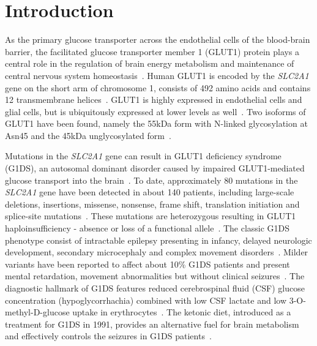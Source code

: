 
\chapter{Introduction} %
\label{Chapter1} %

As the primary glucose transporter across the endothelial cells of the blood-brain barrier, the facilitated glucose transporter member 1 (GLUT1) protein plays a central role in the regulation of brain energy metabolism and maintenance of central nervous system homeostasis~\cite{Pascual}. Human GLUT1 is encoded by the \textit{SLC2A1} gene on the short arm of chromosome 1, consists of 492 amino acids and contains 12 transmembrane \textalpha{} helices~\cite{MUECKLER,Uldry}. GLUT1 is highly expressed in endothelial cells and glial cells, but is ubiquitously expressed at lower levels as well~\cite{Lee,Wheeler}. Two isoforms of GLUT1 have been found, namely the 55kDa form with N-linked glycosylation at Asn45 and the 45kDa unglycosylated form~\cite{Paul-W.-Hruz,Duelli}.

Mutations in the \textit{SLC2A1} gene can result in GLUT1 deficiency syndrome (G1DS), an autosomal dominant disorder caused by impaired GLUT1-mediated glucose transport into the brain~\cite{De,Klepper}. To date, approximately 80 mutations in the \textit{SLC2A1} gene have been detected in about 140 patients, including large-scale deletions, insertions, missense, nonsense, frame shift, translation initiation and splice-site mutations~\cite{Wang, Leen}. These mutations are heterozygous resulting in GLUT1 haploinsufficiency - absence or loss of a functional allele~\cite{Klepper,Leen}. The classic G1DS phenotype consist of intractable epilepsy presenting in infancy, delayed neurologic development, secondary microcephaly and complex movement disorders~\cite{De,Klepper}. Milder variants have been reported to affect about 10\% G1DS patients and present mental retardation, movement abnormalities but without clinical seizures~\cite{Wang,Suls}. The diagnostic hallmark of G1DS features reduced cerebrospinal fluid (CSF) glucose concentration (hypoglycorrhachia) combined with low CSF lactate and low 3-O-methyl-D-glucose uptake in erythrocytes~\cite{Wang,Klepper.2}. The ketonic diet, introduced as a treatment for G1DS in 1991, provides an alternative fuel for brain metabolism and effectively controls the seizures in G1DS patients~\cite{Wang}.

